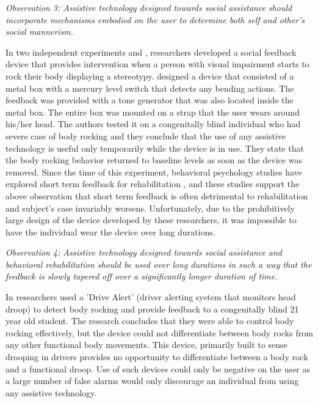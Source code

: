 \documentclass[oneside,11pt]{memoir}
\begin{document}
\emph{Observation 3: Assistive technology designed towards social assistance should incorporate mechanisms embodied on the user to determine both self and other's social mannerism.}

In two independent experiments \cite{transon_using_1988} and \cite{felps_modification_1988}, researchers developed a social feedback device that provides intervention when a person with visual impairment starts to rock their body displaying a stereotypy. \cite{transon_using_1988} designed a device that consisted of a metal box with a mercury level switch that detects any bending actions. The feedback was provided with a tone generator that was also located inside the metal box.  The entire box was mounted on a strap that the user wears around his/her head. The authors tested it on a congenitally blind individual who had severe case of body rocking and they conclude that the use of any assistive technology is useful only temporarily while the device is in use. They state that the body rocking behavior returned to baseline levels as soon as the device was removed. Since the time of this experiment, behavioral psychology studies have explored short term feedback for rehabilitation \cite{jindal-snape_use_2005}, and these studies support the above observation that short term feedback is often detrimental to rehabilitation and subject's case invariably worsens. Unfortunately, due to the prohibitively large design of the device developed by these researchers, it was impossible to have the individual wear the device over long durations.

\emph{Observation 4: Assistive technology designed towards social assistance and behavioral rehabilitation should be used over long durations in such a way that the feedback is slowly tapered off over a significantly longer duration of time.}


In \cite{felps_modification_1988} researchers used a 'Drive Alert' (driver alerting system that monitors head droop) to detect body rocking and provide feedback to a congenitally blind 21 year old student. The research concludes that they were able to control body rocking effectively, but the device could not differentiate between body rocks from any other functional body movements. This device, primarily built to sense drooping in drivers provides no opportunity to differentiate between a body rock and a functional droop. Use of such devices could only be negative on the user as a large number of false alarms would only discourage an individual from using any assistive technology.
\end{document}
